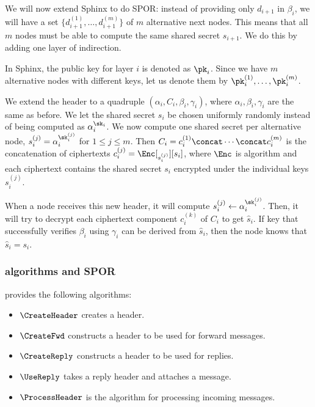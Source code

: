 We will now extend Sphinx to do \ac{SPOR}: instead of providing only \(d_{i+1}\) 
in \(\beta_i\), we will have a set \(\{d_{i+1}^{(1)}, \dotsc, d_{i+1}^{(m)}\}\) 
of \(m\) alternative next nodes.
This means that all \(m\) nodes must be able to compute the same shared secret 
\(s_{i+1}\).
We do this by adding one layer of indirection.

In Sphinx, the public key for layer \(i\) is denoted as \(\pk_i\).
Since we have \(m\) alternative nodes with different keys, let us denote them 
by \(\pk_i^{(1)}, \dotsc, \pk_i^{(m)}\).

We extend the header to a quadruple \((\alpha_i, C_i, \beta_i, \gamma_i)\), 
where \(\alpha_i, \beta_i, \gamma_i\) are the same as before.
We let the shared secret \(s_i\) be chosen uniformly randomly instead of being 
computed as \(\alpha_i^{\sk_i}\).
We now compute one shared secret per alternative node, \ie \(s_i^{(j)} = 
  \alpha_i^{\sk_i^{(j)}}\) for \(1\leq j\leq m\).
Then \(C_i = c_i^{(1)}\concat \dotsb\concat c_i^{(m)}\) is the concatenation of 
ciphertexts \(c_i^{(j)} = \Enc[_{s_i^{(j)}}][s_i]\), where \(\Enc\) is 
 algorithm and each ciphertext contains the shared secret \(s_i\) 
encrypted under the individual keys \(s_i^{(j)}\). 

When a node receives this new header, it will compute \(s_i^{(j)}\gets 
  \alpha_i^{\sk_i^{(j)}}\).
Then, it will try to decrypt each ciphertext component \(c_i^{(k)}\) of \(C_i\) 
to get \(\hat s_i\).
If  key that successfully verifies \(\beta_i\) using \(\gamma_i\) can 
be derived from \(\hat s_i\), then the node knows that \(\hat s_i = s_i\).


\subsubsection{\Sphinxes algorithms and \acf*{SPOR}}

\Sphinxes provides the following algorithms:
\begin{itemize}
  \item \(\CreateHeader\) creates a header.

  \item \(\CreateFwd\) constructs a header to be used for forward messages.

  \item \(\CreateReply\) constructs a header to be used for replies.

  \item \(\UseReply\) takes a reply header and attaches a message.

  \item \(\ProcessHeader\) is the algorithm for processing incoming messages.
\end{itemize}

